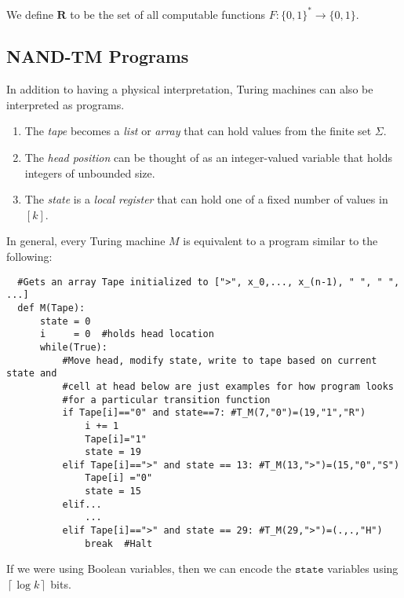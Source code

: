 \documentclass{article}
\begin{document}
  \begin{definition}
  We define $\textbf{R}$ to be the set of all computable functions $F: \{0,1\}^* \longrightarrow \{0,1\}$. 
  \end{definition}

  \subsection{NAND-TM Programs}
  In addition to having a physical interpretation, Turing machines can also be interpreted as programs. 
  \begin{enumerate}
      \item The \textit{tape} becomes a \textit{list} or \textit{array} that can hold values from the finite set $\Sigma$. 
      \item The \textit{head position} can be thought of as an integer-valued variable that holds integers of unbounded size. 
      \item The \textit{state} is a \textit{local register} that can hold one of a fixed number of values in $[k]$. 
  \end{enumerate}
  In general, every Turing machine $M$ is equivalent to a program similar to the following: 
  \begin{lstlisting}
  #Gets an array Tape initialized to [">", x_0,..., x_(n-1), " ", " ", ...]
  def M(Tape): 
      state = 0
      i     = 0  #holds head location
      while(True): 
          #Move head, modify state, write to tape based on current state and 
          #cell at head below are just examples for how program looks 
          #for a particular transition function
          if Tape[i]=="0" and state==7: #T_M(7,"0")=(19,"1","R") 
              i += 1
              Tape[i]="1"
              state = 19
          elif Tape[i]==">" and state == 13: #T_M(13,">")=(15,"0","S")
              Tape[i] ="0"
              state = 15
          elif... 
              ...
          elif Tape[i]==">" and state == 29: #T_M(29,">")=(.,.,"H")
              break  #Halt
  \end{lstlisting}
  If we were using Boolean variables, then we can encode the $\texttt{state}$ variables using $\left\lceil{\log k}\right\rceil$ bits. 
\end{document}
